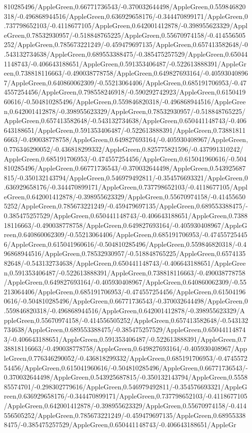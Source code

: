 {\begin{tikzternal}
{810285496/AppleGreen,0.66771736543/-0.370032644498/AppleGreen,0.559846820318/-0.496868944516/AppleGreen,0.636929658176/-0.344470899171/AppleGreen,0.737798652103/-0.4118677105/AppleGreen,0.642001412878/-0.398955623329/AppleGreen,0.78532930957/-0.518848765225/AppleGreen,0.55670974158/-0.414556505252/AppleGreen,0.785673221249/-0.459479697135/AppleGreen,0.657413582648/-0.543132734638/AppleGreen,0.689553388475/-0.385475257529/AppleGreen,0.650441148743/-0.406643188651/AppleGreen,0.591353406487/-0.522613888391/AppleGreen,0.738818116663/-0.490038778758/AppleGreen,0.649827693164/-0.405930408967/AppleGreen,0.640860062309/-0.55213064406/AppleGreen,0.685191706953/-0.474557254456/AppleGreen,0.798558246918/-0.590292742923/AppleGreen,0.615041960616/-0.504810285496/AppleGreen,0.559846820318/-0.496868944516/AppleGreen,0.642001412878/-0.398955623329/AppleGreen,0.78532930957/-0.518848765225/AppleGreen,0.657413582648/-0.543132734638/AppleGreen,0.650441148743/-0.406643188651/AppleGreen,0.591353406487/-0.522613888391/AppleGreen,0.738818116663/-0.490038778758/AppleGreen,0.649827693164/-0.405930408967/AppleGreen,0.776346290052/-0.436818299332/AppleGreen,0.825775821596/-0.437991310242/AppleGreen,0.685191706953/-0.474557254456/AppleGreen,0.615041960616/-0.504810285496/AppleGreen,0.66771736543/-0.370032644498/AppleGreen,0.543925687815/-0.350132143794/AppleGreen,0.546979492811/-0.354576693321/AppleGreen,0.636929658176/-0.344470899171/AppleGreen,0.737798652103/-0.4118677105/AppleGreen,0.642001412878/-0.398955623329/AppleGreen,0.55670974158/-0.414556505252/AppleGreen,0.785673221249/-0.459479697135/AppleGreen,0.689553388475/-0.385475257529/AppleGreen,0.650441148743/-0.406643188651/AppleGreen,0.738818116663/-0.490038778758/AppleGreen,0.649827693164/-0.405930408967/AppleGreen,0.640860062309/-0.55213064406/AppleGreen,0.685191706953/-0.474557254456/AppleGreen,0.615041960616/-0.504810285496/AppleGreen,0.559846820318/-0.496868944516/AppleGreen,0.78532930957/-0.518848765225/AppleGreen,0.657413582648/-0.543132734638/AppleGreen,0.650441148743/-0.406643188651/AppleGreen,0.591353406487/-0.522613888391/AppleGreen,0.738818116663/-0.490038778758/AppleGreen,0.649827693164/-0.405930408967/AppleGreen,0.640860062309/-0.55213064406/AppleGreen,0.685191706953/-0.474557254456/AppleGreen,0.615041960616/-0.504810285496/AppleGreen,0.66771736543/-0.370032644498/AppleGreen,0.559846820318/-0.496868944516/AppleGreen,0.642001412878/-0.398955623329/AppleGreen,0.55670974158/-0.414556505252/AppleGreen,0.657413582648/-0.543132734638/AppleGreen,0.689553388475/-0.385475257529/AppleGreen,0.650441148743/-0.406643188651/AppleGreen,0.591353406487/-0.522613888391/AppleGreen,0.738818116663/-0.490038778758/AppleGreen,0.649827693164/-0.405930408967/AppleGreen,0.776346290052/-0.436818299332/AppleGreen,0.685191706953/-0.474557254456/AppleGreen,0.615041960616/-0.504810285496/AppleGreen,0.66771736543/-0.370032644498/AppleGreen,0.543925687815/-0.350132143794/AppleGreen,0.555885574701/-0.298302779616/AppleGreen,0.546979492811/-0.354576693321/AppleGreen,0.636929658176/-0.344470899171/AppleGreen,0.737798652103/-0.4118677105/AppleGreen,0.642001412878/-0.398955623329/AppleGreen,0.55670974158/-0.414556505252/AppleGreen,0.785673221249/-0.459479697135/AppleGreen,0.689553388475/-0.385475257529/AppleGreen,0.650441148743/-0.406643188651/AppleGr}
\end{tikzternal}}
